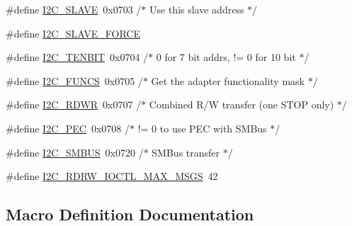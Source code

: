 \begin{DoxyCompactItemize}
\#define \hyperlink{i2c-tools-3_81_81_2include_2linux_2i2c-dev_8h_ab15137f7c592d05573de99f078516157}{I2\+C\+\_\+\+S\+L\+A\+V\+E}~0x0703	/$\ast$ Use this slave address $\ast$/
\item 
\#define \hyperlink{i2c-tools-3_81_81_2include_2linux_2i2c-dev_8h_afb1764d4b58fb542306c715ad6a28a42}{I2\+C\+\_\+\+S\+L\+A\+V\+E\+\_\+\+F\+O\+R\+C\+E}
\item 
\#define \hyperlink{i2c-tools-3_81_81_2include_2linux_2i2c-dev_8h_a2a0b1f3843e98977be7476579c851305}{I2\+C\+\_\+\+T\+E\+N\+B\+I\+T}~0x0704	/$\ast$ 0 for 7 bit addrs, != 0 for 10 bit $\ast$/
\item 
\#define \hyperlink{i2c-tools-3_81_81_2include_2linux_2i2c-dev_8h_a4c2f02700f22d4f76c670966aed5079a}{I2\+C\+\_\+\+F\+U\+N\+C\+S}~0x0705	/$\ast$ Get the adapter functionality mask $\ast$/
\item 
\#define \hyperlink{i2c-tools-3_81_81_2include_2linux_2i2c-dev_8h_a7645f9831bcbbae2339fcff4d85691be}{I2\+C\+\_\+\+R\+D\+W\+R}~0x0707	/$\ast$ Combined R/\+W transfer (one S\+T\+O\+P only) $\ast$/
\item 
\#define \hyperlink{i2c-tools-3_81_81_2include_2linux_2i2c-dev_8h_a2a72d7072db21c407f82e6e73854b38f}{I2\+C\+\_\+\+P\+E\+C}~0x0708	/$\ast$ != 0 to use P\+E\+C with S\+M\+Bus $\ast$/
\item 
\#define \hyperlink{i2c-tools-3_81_81_2include_2linux_2i2c-dev_8h_a4e9d483fb9eb1074646726ce518b1d4d}{I2\+C\+\_\+\+S\+M\+B\+U\+S}~0x0720	/$\ast$ S\+M\+Bus transfer $\ast$/
\item 
\#define \hyperlink{i2c-tools-3_81_81_2include_2linux_2i2c-dev_8h_a272399a0175400a2ebb55ff518a85012}{I2\+C\+\_\+\+R\+D\+R\+W\+\_\+\+I\+O\+C\+T\+L\+\_\+\+M\+A\+X\+\_\+\+M\+S\+G\+S}~42
\end{DoxyCompactItemize}


\subsection{Macro Definition Documentation}
\hypertarget{i2c-tools-3_81_81_2include_2linux_2i2c-dev_8h_a41ba50f5508feed338fe3181540e1894}{}
